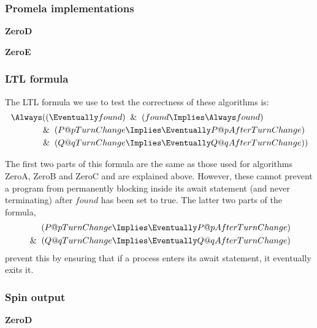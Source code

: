 \documentclass[12pt,a4paper]{scrartcl}
\begin{document}
\subsubsection{Promela implementations}

\textbf{ZeroD}

\textbf{ZeroE}


\subsubsection{LTL formula}

The LTL formula we use to test the correctness of these algorithms is:
\begin{align} 
\Always ( ( \Eventually found ) &\And ( found \Implies \Always found )\notag\\
\And ( P@pTurnChange &\Implies \Eventually P@pAfterTurnChange )\\
\And ( Q@qTurnChange &\Implies \Eventually Q@qAfterTurnChange ) )\notag
\end{align}

The first two parts of this formula are the same as those used for algorithms ZeroA, ZeroB and ZeroC and are explained above. However, these cannot prevent a program from permanently blocking inside its await statement (and never terminating) after $found$ has been set to true. The latter two parts of the formula,
\begin{align} 
( P@pTurnChange &\Implies \Eventually P@pAfterTurnChange )\notag\\
\And ( Q@qTurnChange &\Implies \Eventually Q@qAfterTurnChange ) 
\end{align}
prevent this by ensuring that if a process enters its await statement, it eventually exits it.

\subsubsection{Spin output}

\textbf{ZeroD}
\end{document}
